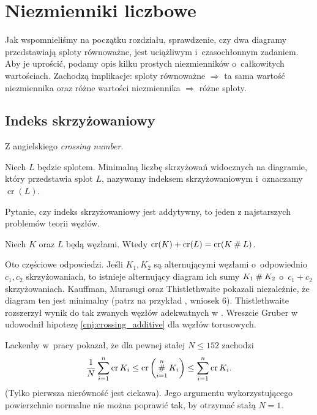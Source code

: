 \section{Niezmienniki liczbowe}
Jak wspomnieliśmy na początku rozdziału, sprawdzenie,
czy dwa diagramy przedstawiają sploty równoważne,
jest uciążliwym i~czasochłonnym zadaniem.
Aby je uprościć, podamy opis kilku prostych niezmienników o~całkowitych wartościach.
Zachodzą implikacje:
sploty równoważne $\Rightarrow$ ta sama wartość niezmiennika
oraz różne wartości niezmiennika $\Rightarrow$ różne sploty.

\subsection{Indeks skrzyżowaniowy} %
\label{sub:crossing_number}
Z angielskiego \emph{crossing number}.

\begin{definition}
    Niech $L$ będzie splotem.
    Minimalną liczbę skrzyżowań widocznych na diagramie, który przedstawia splot $L$, nazywamy indeksem skrzyżowaniowym i~oznaczamy $\operatorname{cr}(L)$.
\end{definition}

Pytanie, czy indeks skrzyżowaniowy jest addytywny, to jeden z najstarszych problemów teorii węzłów.

\begin{conjecture}
    \label{cnj:crossing_additive}
    Niech $K$ oraz $L$ będą węzłami.
    Wtedy $\operatorname{cr}(K) + \operatorname{cr}(L) = \operatorname{cr}(K \mathbin{\#} L)$.
\end{conjecture}

Oto częściowe odpowiedzi.
Jeśli $K_1, K_2$ są alternującymi węzłami o~odpowiednio $c_1, c_2$ skrzyżowaniach, to istnieje alternujący diagram ich sumy $K_1 \mathbin{\#} K_2$ o~$c_1 + c_2$ skrzyżowaniach.
Kauffman, Murasugi oraz Thistlethwaite pokazali niezależnie, że diagram ten jest minimalny (patrz na przykład \cite{murasugi87}, wniosek 6).
Thistlethwaite rozszerzył wynik do tak zwanych węzłów adekwatnych w \cite{thistlethwaite88}.
Wreszcie Gruber w \cite{gruber03} udowodnił hipotezę \ref{cnj:crossing_additive} dla węzłów torusowych.

Lackenby w~pracy \cite{lackenby09} pokazał, że dla pewnej stałej $N \le 152$ zachodzi
\begin{equation}
    \frac 1 N \sum_{i=1}^n \operatorname{cr} K_i \le \operatorname{cr} \left(\operatorname*{\#}_{i=1}^n K_i\right) \le \sum_{i=1}^n \operatorname{cr} K_i.
\end{equation}
(Tylko pierwsza nierówność jest ciekawa).
Jego argumentu wykorzystującego powierzchnie normalne nie można poprawić tak, by otrzymać stałą $N = 1$.

